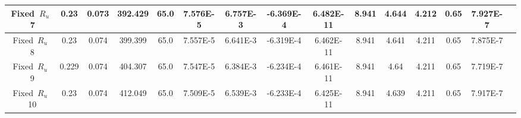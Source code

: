 \documentclass[preview]{standalone}
\begin{document}
\begin{center}
\begin{tabular}{|c|c|c|c|c|c|c|c|c|c|c|c|c|c|c|}
\hline
Fixed\ $R_u$\ 7 & 0.23 & 0.073 & 392.429 & 65.0 & 7.576E-5 & 6.757E-3 & -6.369E-4 & 6.482E-11 & 8.941 & 4.644 & 4.212 & 0.65 & 7.927E-7\\
\hline
Fixed\ $R_u$\ 8 & 0.23 & 0.074 & 399.399 & 65.0 & 7.557E-5 & 6.641E-3 & -6.319E-4 & 6.462E-11 & 8.941 & 4.641 & 4.211 & 0.65 & 7.875E-7\\
\hline
Fixed\ $R_u$\ 9 & 0.229 & 0.074 & 404.307 & 65.0 & 7.547E-5 & 6.384E-3 & -6.234E-4 & 6.461E-11 & 8.941 & 4.64 & 4.211 & 0.65 & 7.719E-7\\
\hline
Fixed\ $R_u$\ 10 & 0.23 & 0.074 & 412.049 & 65.0 & 7.509E-5 & 6.539E-3 & -6.233E-4 & 6.425E-11 & 8.941 & 4.639 & 4.211 & 0.65 & 7.917E-7\\
\hline
\end{tabular}
\end{center}
\end{document}
